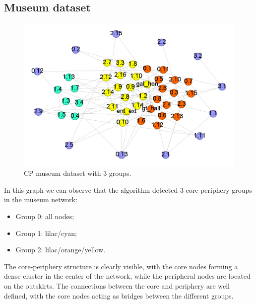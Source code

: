\documentclass[sigconf]{acmart}
\begin{document}
\subsection{Museum dataset}
\FloatBarrier
\begin{figure}[h]
    \centering
    \includegraphics[width=\linewidth]{Img/museum 3 groups.png}
    \caption{CP museum dataset with 3 groups.}
    \label{fig:general cp}
\end{figure}
\FloatBarrier
\noindent In this graph we can observe that the algorithm detected 3 core-periphery groups in the museum network:
\begin{itemize}
    \item Group 0: all nodes;
    \item Group 1: lilac/cyan;
    \item Group 2: lilac/orange/yellow.
\end{itemize}
The core-periphery structure is clearly visible, with the core nodes forming a dense cluster in the center of the network, while the peripheral nodes are located on the outskirts. The connections between the core and periphery are well defined, with the core nodes acting as bridges between the different groups.
\end{document}
